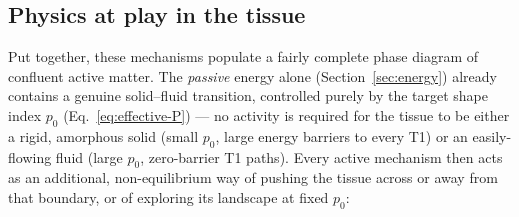 \documentclass[11pt]{article}
\begin{document}
\subsection{Physics at play in the tissue}
\label{sec:physics-discussion}
Put together, these mechanisms populate a fairly complete phase diagram of confluent
active matter. The \emph{passive} energy alone (Section~\ref{sec:energy}) already
contains a genuine solid--fluid transition, controlled purely by the target shape index
$p_0$ (Eq.~\eqref{eq:effective-P}) --- no activity is required for the tissue to be
either a rigid, amorphous solid (small $p_0$, large energy barriers to every T1) or an
easily-flowing fluid (large $p_0$, zero-barrier T1 paths). Every active mechanism then
acts as an additional, non-equilibrium way of pushing the tissue across or away from
that boundary, or of exploring its landscape at fixed $p_0$:
\end{document}
